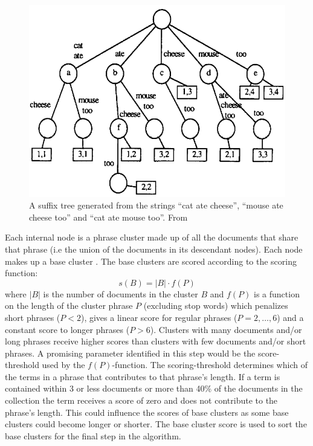 \begin{figure}[!ht]
  \begin{center}
    \includegraphics[totalheight=0.3\textheight]{Figures/suffixtree}
  \end{center}
  \caption{A suffix tree generated from the strings “cat ate cheese”, “mouse ate cheese too” and “cat ate mouse too”. From  \protect \cite[][48]{Oren1998}}
  \label{fig:suffixtree}
\end{figure}

Each internal node is a phrase cluster made up of all the documents that share that phrase (i.e the union of the documents in its descendant nodes). Each node makes up a base cluster \cite{Oren1998}. The base clusters are scored according to the scoring function: 
\begin{displaymath}s(B) = 
\vert B \vert \cdot f(P)
\end{displaymath} 
where \(\vert B \vert\) 
is the number of documents in the cluster \(B\) and  \(f(P)\) is a function on the length of the cluster phrase \(P\) (excluding stop words) which penalizes short phrases (\( P < 2\)), gives a linear score for regular phrases (\(P = {2,\dots,6}\)) and a constant score to longer phrases (\( P > 6\)). Clusters with many documents and/or long phrases receive higher scores than clusters with few documents and/or short phrases. A promising parameter identified in this step would be the score-threshold used by the \(f(P)\)-function. The scoring-threshold determines which of the terms in a phrase that contributes to that phrase's length. If a term is contained within 3 or less documents or more than 40\% of the documents in the collection the term receives a score of zero and does not contribute to the phrase's length. This could influence the scores of base clusters as some base clusters could become longer or shorter. The base cluster score is used to sort the base clusters for the final step in the \STC algorithm.

